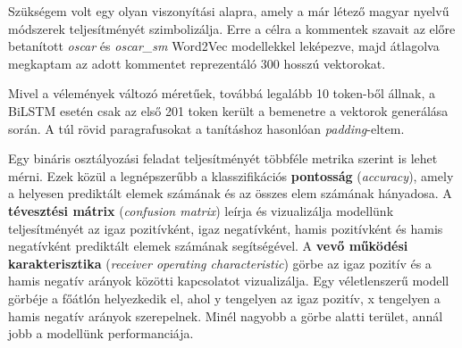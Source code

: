 Szükségem volt egy olyan viszonyítási alapra, amely a már létező magyar nyelvű módszerek teljesítményét szimbolizálja. Erre a célra a kommentek szavait az előre betanított \textit{oscar} és \textit{oscar\_sm} Word2Vec modellekkel leképezve, majd átlagolva megkaptam az adott kommentet reprezentáló 300 hosszú vektorokat.

Mivel a vélemények változó méretűek, továbbá legalább 10 token-ből állnak, a BiLSTM esetén csak az első 201 token került a bemenetre a vektorok generálása során. A túl rövid paragrafusokat a tanításhoz hasonlóan \textit{padding}-eltem.

Egy bináris osztályozási feladat teljesítményét többféle metrika szerint is lehet mérni. Ezek közül a legnépszerűbb a klasszifikációs \textbf{pontosság} (\textit{accuracy}), amely a helyesen prediktált elemek számának és az összes elem számának hányadosa. A \textbf{tévesztési mátrix} (\textit{confusion matrix}) leírja és vizualizálja modellünk teljesítményét az igaz pozitívként, igaz negatívként, hamis pozitívként és hamis negatívként prediktált elemek számának segítségével. A \textbf{vevő működési karakterisztika} (\textit{receiver operating characteristic}) görbe az igaz pozitív és a hamis negatív arányok közötti kapcsolatot vizualizálja. Egy véletlenszerű modell görbéje a főátlón helyezkedik el, ahol y tengelyen az igaz pozitív, x tengelyen a hamis negatív arányok szerepelnek. Minél nagyobb a görbe alatti terület, annál jobb a modellünk performanciája.












